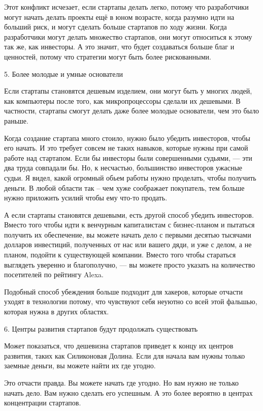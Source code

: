 \documentclass[ebook,12pt,oneside,openany]{memoir}
\begin{document}
Этот конфликт исчезает, если стартапы делать легко, потому что
разработчики могут начать делать проекты ещё в юном возрасте, когда
разумно идти на больший риск, и могут сделать больше стартапов по ходу
жизни. Когда разработчики могут делать множество стартапов, они могут
относиться к этому так же, как инвесторы. А это значит, что будет
создаваться больше благ и ценностей, потому что стратегии могут быть
более рискованными.

5. Более молодые и умные основатели

Если стартапы становятся дешевым изделием, они могут быть у многих
людей, как компьютеры после того, как микропроцессоры сделали их
дешевыми. В частности, стартапы смогут делать даже более молодые
основатели, чем это было раньше.

Когда создание стартапа много стоило, нужно было убедить инвесторов,
чтобы его начать. И это требует совсем не таких навыков, которые нужны
при самой работе над стартапом. Если бы инвесторы были совершенными
судьями, — эти два труда совпадали бы. Но, к несчастью, большинство
инвесторов ужасные судьи. Я видел, какой огромный обьем работы нужно
проделать, чтобы получить деньги. В любой области так -- чем хуже
соображает покупатель, тем больше нужно приложить усилий чтобы ему
что-то продать.

А если стартапы становятся дешевыми, есть другой способ убедить
инвесторов. Вместо того чтобы идти к венчурным капиталистам с
бизнес-планом и пытаться получить их обеспечение, вы можете начать
дело с первыми десятью тысячами долларов инвестиций, полученных от нас
или вашего дяди, и уже с делом, а не планом, подойти к существующей
компании. Вместо того чтобы стараться выглядеть уверенно и
благополучно, — вы можете просто указать на количество посетителей по
рейтингу Alexa.

Подобный способ убеждения больше подходит для хакеров, которые отчасти
уходят в технологии потому, что чувствуют себя неуютно со всей этой
фальшью, которая нужна в других областях.

6. Центры развития стартапов будут продолжать существовать

Может показаться, что дешевизна стартапов приведет к концу их центров
развития, таких как Силиконовая Долина. Если для начала вам нужны
только заемные деньги, вы можете найти их где угодно.

Это отчасти правда. Вы можете начать где угодно. Но вам нужно не
только начать дело. Вам нужно сделать его успешным. А это более
вероятно в центрах концентрации стартапов.
\end{document}
